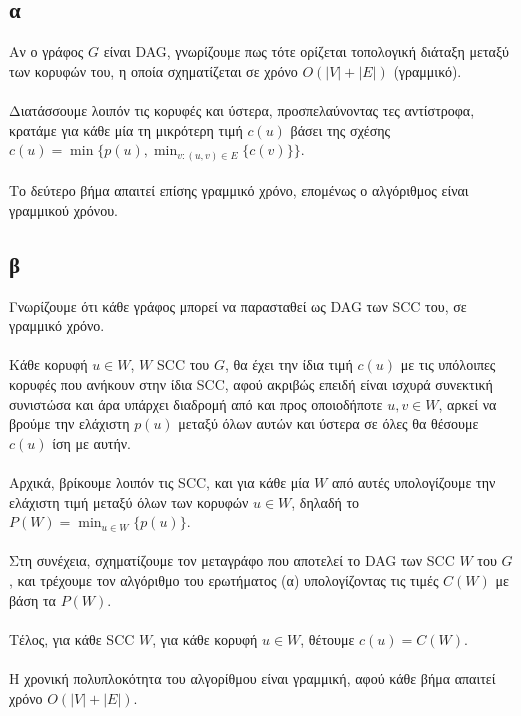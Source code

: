 \documentclass[12pt,a4paper]{article}
\begin{document}
  \subsection{α}

  Aν ο γράφος \( G \) είναι {\latintext DAG}, γνωρίζουμε πως τότε ορίζεται
  τοπολογική διάταξη μεταξύ των κορυφών του, η οποία σχηματίζεται σε χρόνο
  \( Ο(|V| + |E|) \) (γραμμικό).
  \\
  \\
  Διατάσσουμε λοιπόν τις κορυφές και ύστερα,
  προσπελαύνοντας τες αντίστροφα, κρατάμε για κάθε μία τη μικρότερη τιμή
  \( c(u) \) βάσει της σχέσης \( c(u) = \min\{ p(u), \min_{ v : (u, v) \in E}
  \{c(v)\}\} \).
  \\
  \\
  Το δεύτερο βήμα απαιτεί επίσης γραμμικό χρόνο, επομένως ο αλγόριθμος είναι
  γραμμικού χρόνου.

  \subsection{β}

  Γνωρίζουμε ότι κάθε γράφος μπορεί να παρασταθεί ως {\latintext DAG} των 
  {\latintext SCC} του, σε γραμμικό χρόνο.
  \\
  \\
  Κάθε κορυφή \( u \in W \), \( W \) {\latintext SCC} του \( G \),
  θα έχει την ίδια τιμή \( c(u) \) με τις υπόλοιπες κορυφές που
  ανήκουν στην ίδια {\latintext SCC}, αφού ακριβώς επειδή είναι ισχυρά συνεκτική
  συνιστώσα και άρα υπάρχει διαδρομή από και προς οποιοδήποτε
  \( u, v \in W \), αρκεί να
  βρούμε την ελάχιστη \( p(u) \) μεταξύ όλων αυτών και ύστερα σε όλες θα θέσουμε
  \( c(u) \) ίση με αυτήν.
  \\
  \\
  Αρχικά, βρίκουμε λοιπόν τις {\latintext SCC}, και για κάθε μία \( W \) από
  αυτές υπολογίζουμε την ελάχιστη τιμή μεταξύ όλων των κορυφών \( u \in W \),
  δηλαδή το \( P(W) = \min_{u \in W}\{ p(u) \}\).
  \\
  \\
  Στη συνέχεια, σχηματίζουμε τον μεταγράφο που αποτελεί το {\latintext DAG} των 
  {\latintext SCC \( W \)} του \( G \), και τρέχουμε τον αλγόριθμο του
  ερωτήματος (α) υπολογίζοντας τις τιμές \( C(W) \) με βάση τα \( P(W) \).
  \\
  \\
  Tέλος, για κάθε {\latintext SCC \(W\)}, για κάθε κορυφή \(u \in W \), θέτουμε
  \( c(u) = C(W) \).
  \\
  \\
  Η χρονική πολυπλοκότητα του αλγορίθμου είναι γραμμική, αφού κάθε βήμα απαιτεί
  χρόνο \( Ο(|V| + |E|) \).
\end{document}

